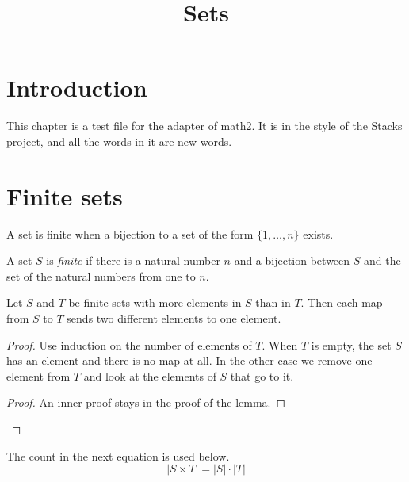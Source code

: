 


\title{Sets}



\maketitle

\label{section-phantom}

\tableofcontents

\section{Introduction}
\label{section-introduction}

\noindent
This chapter is a test file for the adapter of math2. It is in the style of
the Stacks project, and all the words in it are new words.

\section{Finite sets}
\label{section-finite}

\noindent
A set is finite when a bijection to a set of the form $\{1, \ldots, n\}$
exists.

\begin{definition}
\label{definition-finite}
A set $S$ is {\it finite} if there is a natural number $n$ and a bijection
between $S$ and the set of the natural numbers from one to $n$.
\end{definition}

\begin{lemma}[Pigeonhole]
\label{lemma-pigeonhole}
Let $S$ and $T$ be finite sets with more elements in $S$ than in $T$.
Then each map from $S$ to $T$ sends two different elements to one element.
\end{lemma}

\begin{proof}
Use induction on the number of elements of $T$. When $T$ is empty, the
set $S$ has an element and there is no map at all. In the other case we
remove one element from $T$ and look at the elements of $S$ that go to it.
\begin{proof}
An inner proof stays in the proof of the lemma.
\end{proof}
\end{proof}

\noindent
The count in the next equation is used below.
\begin{equation}
\label{equation-count}
|S \times T| = |S| \cdot |T|
\end{equation}

